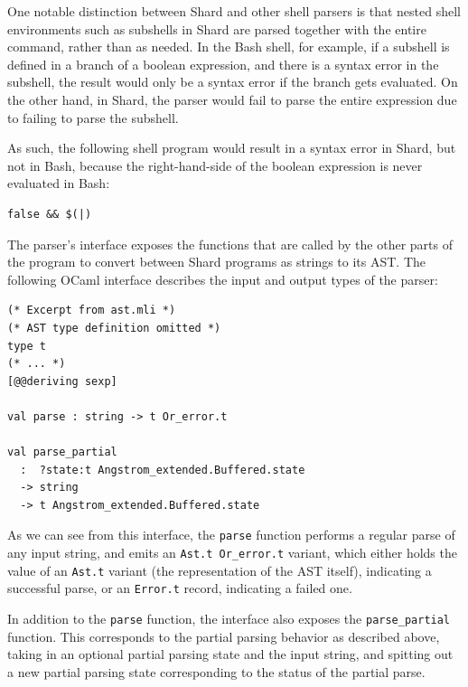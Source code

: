 \documentclass[twoside]{report}
\begin{document}
One notable distinction between Shard and other shell parsers is that nested shell environments such as subshells in Shard are parsed together with the entire command, rather than as needed.
In the Bash shell, for example, if a subshell is defined in a branch of a boolean expression, and there is a syntax error in the subshell, the result would only be a syntax error if the branch gets evaluated.
On the other hand, in Shard, the parser would fail to parse the entire expression due to failing to parse the subshell.

As such, the following shell program would result in a syntax error in Shard, but not in Bash, because the right-hand-side of the boolean expression is never evaluated in Bash:

\begin{minipage}[c]{\textwidth-15pt}
  \begin{lstlisting}[language=shard]
false && $(|)
\end{lstlisting}
  \smallskip
\end{minipage}

The parser's interface exposes the functions that are called by the other parts of the program to convert between Shard programs as strings to its AST. The following OCaml interface describes the input and output types of the parser:

\begin{minipage}[c]{\textwidth-15pt}
  \begin{lstlisting}
(* Excerpt from ast.mli *)
(* AST type definition omitted *)
type t
(* ... *)
[@@deriving sexp]

val parse : string -> t Or_error.t

val parse_partial
  :  ?state:t Angstrom_extended.Buffered.state
  -> string
  -> t Angstrom_extended.Buffered.state
\end{lstlisting}
  \smallskip
\end{minipage}

As we can see from this interface, the \texttt{parse} function performs a regular parse of any input string, and emits an \texttt{Ast.t Or\_error.t} variant, which either holds the value of an \texttt{Ast.t} variant (the representation of the AST itself), indicating a successful parse, or an \texttt{Error.t} record, indicating a failed one.

In addition to the \texttt{parse} function, the interface also exposes the \texttt{parse\_partial} function. This corresponds to the partial parsing behavior as described above, taking in an optional partial parsing state and the input string, and spitting out a new partial parsing state corresponding to the status of the partial parse.
\end{document}
